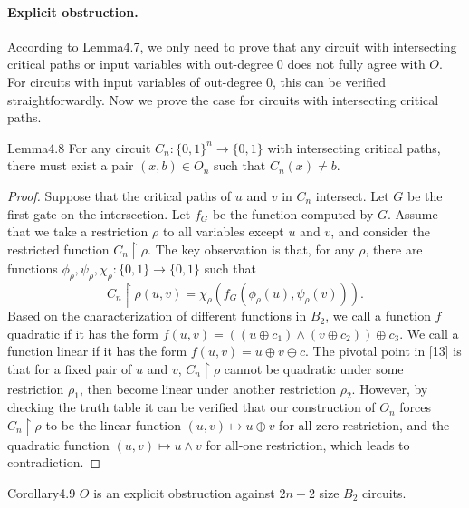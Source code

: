 \paragraph{Explicit obstruction.} According to Lemma4.7, we only need to prove that any circuit with intersecting critical paths or input variables with out-degree 0 does not fully agree with $O$. For circuits with input variables of out-degree 0, this can be verified straightforwardly. Now we prove the case for circuits with intersecting critical paths.
\begin{authorclaim}{Lemma4.8}
For any circuit $C_n:\{0,1\}^n\to\{0,1\}$ with intersecting critical paths, there must exist a pair $(x,b)\in O_n$ such that $C_n(x)\ne b$.
\end{authorclaim}
\begin{proof}
Suppose that the critical paths of $u$ and $v$ in $C_n$ intersect. Let $G$ be the first gate on the intersection. Let $f_G$ be the function computed by $G$. Assume that we take a restriction $\rho$ to all variables except $u$ and $v$, and consider the restricted function $C_n\upharpoonright\rho$. The key observation is that, for any $\rho$, there are functions $\phi_\rho,\psi_\rho,\chi_\rho:\{0,1\}\to\{0,1\}$ such that
\[C_n\upharpoonright\rho(u,v)=\chi_\rho(f_G(\phi_\rho(u),\psi_\rho(v))).\]
Based on the characterization of different functions in $B_2$, we call a function $f$ quadratic if it has the form $f(u,v)=((u\oplus c_1)\wedge(v\oplus c_2))\oplus c_3$. We call a function linear if it has the form $f(u,v)=u\oplus v\oplus c$. The pivotal point in [13] is that for a fixed pair of $u$ and $v$, $C_n\upharpoonright\rho$ cannot be quadratic under some restriction $\rho_1$, then become linear under another restriction $\rho_2$. However, by checking the truth table it can be verified that our construction of $O_n$ forces $C_n\upharpoonright\rho$ to be the linear function $(u,v)\mapsto u\oplus v$ for all-zero restriction, and the quadratic function $(u,v)\mapsto u\wedge v$ for all-one restriction, which leads to contradiction.
\end{proof}
\begin{authorclaim}{Corollary4.9}
$O$ is an explicit obstruction against $2n-2$ size $B_2$ circuits.
\end{authorclaim}
